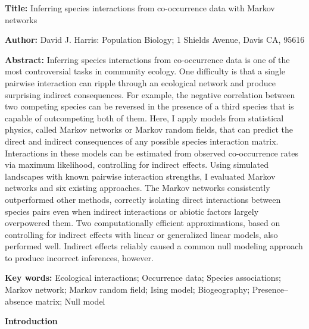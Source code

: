 \documentclass[12pt,]{article}
\date{}
\begin{document}
\begin{spacing}{1.9}
\begin{flushleft}
\renewcommand{\headrulewidth}{0pt}

\setlength{\parskip}{1pt}

\textbf{Title:} Inferring species interactions from co-occurrence data
with Markov networks

\textbf{Author:} David J. Harris: Population Biology; 1 Shields Avenue,
Davis CA, 95616

\textbf{Abstract:} Inferring species interactions from co-occurrence
data is one of the most controversial tasks in community ecology. One
difficulty is that a single pairwise interaction can ripple through an
ecological network and produce surprising indirect consequences. For
example, the negative correlation between two competing species can be
reversed in the presence of a third species that is capable of
outcompeting both of them. Here, I apply models from statistical
physics, called Markov networks or Markov random fields, that can
predict the direct and indirect consequences of any possible species
interaction matrix. Interactions in these models can be estimated from
observed co-occurrence rates via maximum likelihood, controlling for
indirect effects. Using simulated landscapes with known pairwise
interaction strengths, I evaluated Markov networks and six existing
approaches. The Markov networks consistently outperformed other methods,
correctly isolating direct interactions between species pairs even when
indirect interactions or abiotic factors largely overpowered them. Two
computationally efficient approximations, based on controlling for
indirect effects with linear or generalized linear models, also
performed well. Indirect effects reliably caused a common null modeling
approach to produce incorrect inferences, however.

\textbf{Key words:} Ecological interactions; Occurrence data; Species
associations; Markov network; Markov random field; Ising model;
Biogeography; Presence--absence matrix; Null model

\noindent\textbf{Introduction}

\setlength{\parindent}{2em}


\end{flushleft}
\end{spacing}
\end{document}
